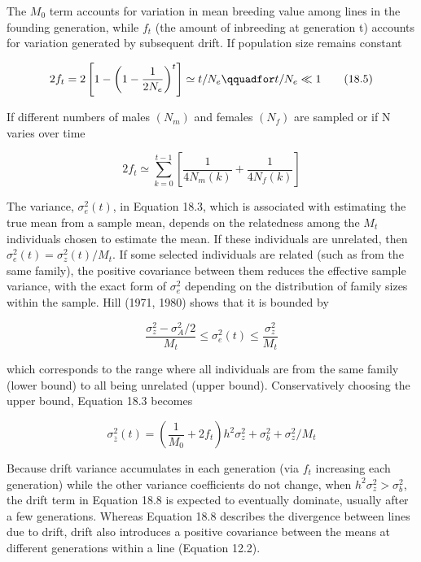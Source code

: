 \documentclass{article}
\begin{document}
The  $ M_{0} $ term accounts for variation in mean breeding value among lines in the founding generation, while  $ f_{t} $ (the amount of inbreeding at generation t) accounts for variation generated by subsequent drift. If population size remains constant

\begin{equation}
2f_{t}=2\left[1-\left(1-\frac{1}{2N_{e}}\right)^{t}\right]\simeq t/N_{e}\qquadfor t/N_{e}\ll1
\tag{18.5}
\label{eq:18_5}
\end{equation}

If different numbers of males  $ (N_{m}) $ and females  $ (N_{f}) $ are sampled or if N varies over time

\begin{equation}
2f_{t}\simeq\sum_{k=0}^{t-1}\left[\frac{1}{4N_{m}(k)}+\frac{1}{4N_{f}(k)}\right]
\tag{18.6}
\label{eq:18_6}
\end{equation}

The variance,  $ \sigma_e^2(t) $, in Equation 18.3, which is associated with estimating the true mean from a sample mean, depends on the relatedness among the  $ M_t $ individuals chosen to estimate the mean. If these individuals are unrelated, then  $ \sigma_e^2(t) = \sigma_z^2(t)/M_t $. If some selected individuals are related (such as from the same family), the positive covariance between them reduces the effective sample variance, with the exact form of  $ \sigma_e^2 $ depending on the distribution of family sizes within the sample. Hill (1971, 1980) shows that it is bounded by

\begin{equation}
\frac{\sigma_{z}^{2}-\sigma_{A}^{2}/2}{M_{t}}\leq\sigma_{e}^{2}(t)\leq\frac{\sigma_{z}^{2}}{M_{t}}
\tag{18.7}
\label{eq:18_7}
\end{equation}

which corresponds to the range where all individuals are from the same family (lower bound) to all being unrelated (upper bound). Conservatively choosing the upper bound, Equation 18.3 becomes

\begin{equation}
\sigma_{\overline{z}}^{2}(t)=\left(\frac{1}{M_{0}}+2f_{t}\right)h^{2}\sigma_{z}^{2}+\sigma_{b}^{2}+\sigma_{z}^{2}/M_{t}
\tag{18.8}
\label{eq:18_8}
\end{equation}

Because drift variance accumulates in each generation (via $f_t$ increasing each generation) while the other variance coefficients do not change, when $h^2\sigma_z^2 > \sigma_b^2$, the drift term in Equation 18.8 is expected to eventually dominate, usually after a few generations. Whereas Equation 18.8 describes the divergence between lines due to drift, drift also introduces a positive covariance between the means at different generations within a line (Equation 12.2).
\end{document}
